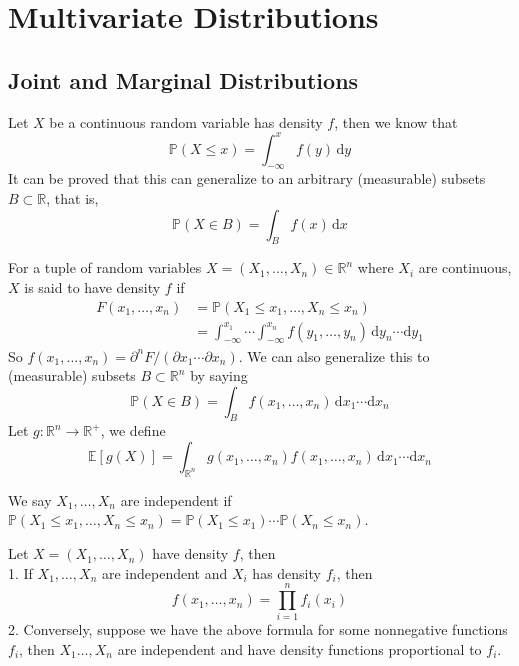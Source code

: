 \section{Multivariate Distributions}
\subsection{Joint and Marginal Distributions}
Let $X$ be a continuous random variable has density $f$, then we know that
$$\mathbb P(X\le x)=\int_{-\infty}^xf(y)\,\mathrm dy$$
It can be proved that this can generalize to an arbitrary (measurable) subsets $B\subset\mathbb R$, that is,
$$\mathbb P(X\in B)=\int_Bf(x)\,\mathrm dx$$
\begin{definition}
    For a tuple of random variables $X=(X_1,\ldots,X_n)\in\mathbb R^n$ where $X_i$ are continuous, $X$ is said to have density $f$ if
    \begin{align*}
        F(x_1,\ldots,x_n)&=\mathbb P(X_1\le x_1,\ldots,X_n\le x_n)\\
        &=\int_{-\infty}^{x_1}\cdots\int_{-\infty}^{x_n}f(y_1,\ldots,y_n)\,\mathrm dy_n\cdots\mathrm dy_1
    \end{align*}
    So $f(x_1,\ldots,x_n)=\partial^n F/(\partial x_1\cdots\partial x_n)$.
    We can also generalize this to (measurable) subsets $B\subset\mathbb R^n$ by saying
    $$\mathbb P(X\in B)=\int_Bf(x_1,\ldots,x_n)\,\mathrm dx_1\cdots\mathrm dx_n$$
    Let $g:\mathbb R^n\to\mathbb R^+$, we define
    $$\mathbb E[g(X)]=\int_{\mathbb R^n}g(x_1,\ldots,x_n)f(x_1,\ldots,x_n)\,\mathrm dx_1\cdots\mathrm dx_n$$
\end{definition}
\begin{definition}
    We say $X_1,\ldots,X_n$ are independent if $\mathbb P(X_1\le x_1,\ldots,X_n\le x_n)=\mathbb P(X_1\le x_1)\cdots\mathbb P(X_n\le x_n)$.
\end{definition}
\begin{theorem}
    Let $X=(X_1,\ldots,X_n)$ have density $f$, then\\
    1. If $X_1,\ldots,X_n$ are independent and $X_i$ has density $f_i$, then
    $$f(x_1,\ldots,x_n)=\prod_{i=1}^nf_i(x_i)$$
    2. Conversely, suppose we have the above formula for some nonnegative functions $f_i$, then $X_1\ldots,X_n$ are independent and have density functions proportional to $f_i$.
\end{theorem}
